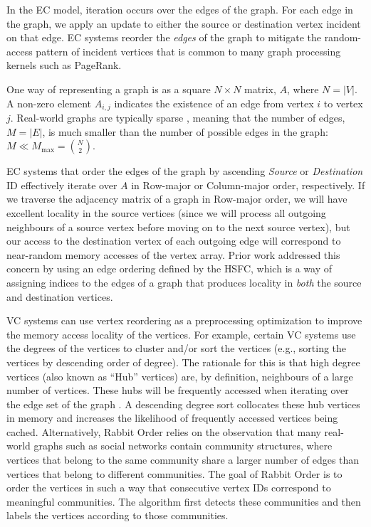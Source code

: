 \par In the \ac{EC} model, iteration occurs over the edges of the graph. For each edge in the graph, we apply an update to either the source or destination vertex incident on that edge. \ac{EC} systems reorder the \textit{edges} of the graph to mitigate the random-access pattern of incident vertices that is common to many graph processing kernels such as PageRank.

\par One way of representing a graph is as a square $N \times N$ matrix, $A$, where $N= |V|$. A non-zero element $A_{i, j}$ indicates the existence of an edge from vertex $i$ to vertex $j$. Real-world graphs are typically sparse \cite{listingkcliques}, meaning that the number of edges, $M=|E|$, is much smaller than the number of possible edges in the graph: $M\ll M_{\max} = {N \choose 2}$. 

\par \ac{EC} systems that order the edges of the graph by ascending \textit{Source} or \textit{Destination} ID effectively iterate over $A$ in Row-major or Column-major order, respectively. If we traverse the adjacency matrix of a graph in Row-major order, we will have excellent locality in the source vertices (since we will process all outgoing neighbours of a source vertex before moving on to the next source vertex), but our access to the destination vertex of each outgoing edge will correspond to near-random memory accesses of the vertex array. Prior work \cite{cost} addressed this concern by using an edge ordering defined by the \ac{HSFC}, which is a way of assigning indices to the edges of a graph that produces locality in \textit{both} the source and destination vertices. 

\par \ac{VC} systems can use vertex reordering as a preprocessing optimization to improve the memory access locality of the vertices. For example, certain \ac{VC} systems \cite{dbg, cagra} use the degrees of the vertices to cluster and/or sort the vertices (e.g., sorting the vertices by descending order of degree). The rationale for this is that high degree vertices (also known as ``Hub'' vertices) are, by definition, neighbours of a large number of vertices. These hubs will be frequently accessed when iterating over the edge set of the graph \cite{lwr}. A descending degree sort collocates these hub vertices in memory and increases the likelihood of frequently accessed vertices being cached. Alternatively, Rabbit Order \cite{rabbit} relies on the observation that many real-world graphs such as social networks contain community structures, where vertices that belong to the same community share a larger number of edges than vertices that belong to different communities. The goal of Rabbit Order is to order the vertices in such a way that consecutive vertex IDs correspond to meaningful communities. The algorithm first detects these communities and then labels the vertices according to those communities. 

